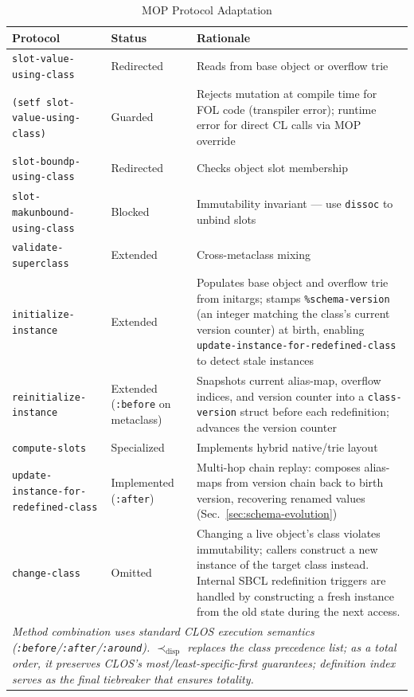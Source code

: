 \documentclass[sigconf,nonacm]{acmart}
\begin{document}
\begin{table}[tp]
\caption{MOP Protocol Adaptation}
\label{tab:mop-ops}

\begin{tabularx}{\textwidth}{l l X}
\toprule
\textbf{Protocol} & \textbf{Status} & \textbf{Rationale} \\
\midrule
\texttt{slot-value-using-class} & Redirected & Reads from base object or overflow trie \\
\texttt{(setf slot-value-using-class)} & Guarded & Rejects mutation at compile time for FOL code (transpiler error); runtime error for direct CL calls via MOP override \\
\texttt{slot-boundp-using-class} & Redirected & Checks object slot membership \\
\texttt{slot-makunbound-using-class} & Blocked & Immutability invariant --- use \texttt{dissoc} to unbind slots \\
\texttt{validate-superclass} & Extended & Cross-metaclass mixing \\
\texttt{initialize-instance} & Extended & Populates base object and overflow trie from initargs; stamps \texttt{\%schema-version} (an integer matching the class's current version counter) at birth, enabling \texttt{update-instance-for-redefined-class} to detect stale instances \\
\texttt{reinitialize-instance} & Extended (\texttt{:before} on metaclass) & Snapshots current alias-map, overflow indices, and version counter into a \texttt{class-version} struct before each redefinition; advances the version counter \\
\texttt{compute-slots} & Specialized & Implements hybrid native/trie layout \\
\texttt{update-instance-for-redefined-class} & Implemented (\texttt{:after}) & Multi-hop chain replay: composes alias-maps from version chain back to birth version, recovering renamed values (Sec.~\ref{sec:schema-evolution}) \\
\texttt{change-class} & Omitted & Changing a live object's class violates immutability; callers construct a new instance of the target class instead. Internal SBCL redefinition triggers are handled by constructing a fresh instance from the old state during the next access. \\
\midrule
\multicolumn{3}{p{\textwidth}}{\textit{Method combination uses standard CLOS execution semantics
(\texttt{:before}/\texttt{:after}/\texttt{:around}). $\prec_{\text{disp}}$ replaces the class precedence list; as a total order, it preserves CLOS's most/least-specific-first guarantees; definition index serves as the final tiebreaker that ensures totality.}} \\
\bottomrule
\end{tabularx}
\end{table}
\end{document}

